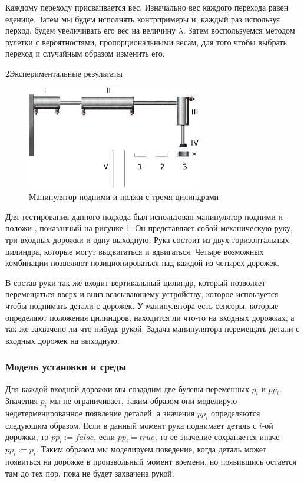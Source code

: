 \documentclass[14pt]{extarticle}
\makeatletter
\theoremstyle{plain}
\theoremstyle{definition}
\renewcommand{\subsection}{\@startsection{subsection}{2}{0mm}%
{2\baselineskip}{\baselineskip}{\bfseries\large\itshape}}
\makeatother
\begin{document}
Каждому переходу присваивается вес. Изначально вес каждого перехода равен
еденице. Затем мы будем исполнять контрпримеры и, каждый раз используя перход,
будем увеличивать его вес на величину $\lambda$. Затем воспользуемся методом
рулетки с вероятностями, пропорциональными весам, для того чтобы выбрать
переход и случайным образом изменить его.

\subsection{Экспериментальные результаты}

\begin{figure}[t]
    \centering
    \includegraphics[width=3in]{pic/pnp.eps}
    \caption{Манипулятор подними-и-полжи с тремя цилиндрами}
    \label{pnp-system}
\end{figure}

Для тестирования данного подхода был использован манипулятор подними-и-положи \cite{pnp},
показанный на рисунке \ref{pnp-system}.
Он представляет собой механическую руку, три входных дорожки и одну выходную.
Рука состоит из двух горизонтальных цилиндра, которые могут выдвигаться и
вдвигаться. Четыре возможных комбинации позволяют позиционироваться над
каждой из четырех дорожек. 

В состав руки так же входит вертикальный цилиндр, который позволяет
перемещаться вверх и вниз всасывающему устройству, которое испоьзуется чтобы
поднимать детали с дорожек. У манипулятора есть сенсоры, которые определяют
положения цилиндров, находится ли что-то на входных дорожках, а так же
захвачено ли что-нибудь рукой. Задача манипулятора перемещать детали с входных
дорожек на выходную.

\subsubsection{Модель установки и среды}

Для каждой входной дорожки мы создадим две булевы переменных $p_i$ и $pp_i$.
Значения $p_i$ мы не ограничивает, таким образом они моделирую
недетерменированное появление деталей, а значения $pp_i$ определяются
следующим образом. Если в данный момент рука поднимает деталь с $i$-ой
дорожки, то $pp_i := false$, если $pp_i = true$, то ее значение сохраняется
иначе $pp_i := p_i$. Таким образом мы моделируем поведение, когда деталь
может появиться на дорожке в произвольный момент времени, но появившись
остается там до тех пор, пока не будет захвачена рукой.
\end{document}
